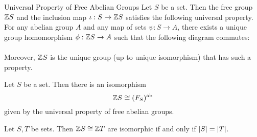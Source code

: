 \documentclass[a4paper]{article}
\begin{document}
\begin{prp}{Universal Property of Free Abelian Groups}{} Let $S$ be a set. Then the free group $\mathbb{Z} S$ and the inclusion map $\iota:S\to\mathbb{Z} S$ satisfies the following universal property. For any abelian group $A$ and any map of sets $\psi:S\to A$, there exists a unique group homomorphism $\phi:\mathbb{Z} S\to A$ such that the following diagram commutes: \\
 \\
Moreover, $\mathbb{Z} S$ is the unique group (up to unique isomorphism) that has such a property. 
\end{prp}

\begin{prp}{}{} Let $S$ be a set. Then there is an isomorphism $$\mathbb{Z} S\cong(F_S)^\text{ab}$$ given by the universal property of free abelian groups. 
\end{prp}

\begin{prp}{}{} Let $S,T$ be sets. Then $\mathbb{Z} S\cong\mathbb{Z} T$ are isomorphic if and only if $\abs{S}=\abs{T}$. 
\end{prp}
\end{document}
